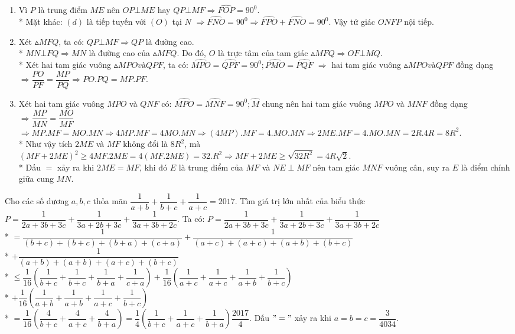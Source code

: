 \begin{ex}
{\begin{enumerate}
       \item Vì $P$ là trung điểm $ME$ nên $OP\bot ME$ hay $QP\bot MF \Rightarrow \widehat{FOP}=90^{0}$.\\*
        Mặt khác: $(d)$ là tiếp tuyến với $(O)$ tại $N$ $\Rightarrow \widehat{FNO}=90^{0}\Rightarrow \widehat{FPO}+ \widehat{FNO}=90^{0}.$ Vậy tứ giác $ONFP$ nội tiếp.
        \item Xét $\vartriangle MFQ$, ta có: $QP\bot MF \Rightarrow QP$ là đường cao.\\*
        $MN\bot FQ \Rightarrow MN$ là đường cao của $\vartriangle MFQ$. Do đó, $O$ là trực tâm của tam giác $\vartriangle MFQ \Rightarrow OF\bot MQ$.\\*
        Xét hai tam giác vuông $\vartriangle MPO và QPF$, ta có: $\widehat{MPO}=\widehat{QPF}=90^{0}; \widehat{PMO}=\widehat{PQF}$ $\Rightarrow$ hai tam giác vuông $\vartriangle MPO và QPF$ đồng dạng $\Rightarrow \dfrac{PO}{PF}=\dfrac{MP}{PQ}\Rightarrow PO.PQ=MP.PF$.
        \item Xét hai tam giác vuông $MPO$ và $QNF$ có: $\widehat{MPO}=\widehat{MNF}=90^{0};\widehat{M}$ chung nên hai tam giác vuông $MPO$ và $MNF$ đồng dạng $\Rightarrow \dfrac{MP}{MN}=\dfrac{MO}{MF}$ $\Rightarrow MP.MF=MO.MN \Rightarrow 4MP.MF=4MO.MN \Rightarrow (4MP).MF=4.MO.MN \Rightarrow 2ME.MF=4.MO.MN=2R.4R=8R^{2}$.\\*
        Như vậy tích $2ME$ và $MF$ không đổi là $8R^{2}$, mà $\left(MF+2ME\right)^{2}\geq 4MF.2ME=4(MF.2ME)=32.R^{2} \Rightarrow MF+2ME\geq \sqrt{32R^{2}}=4R\sqrt{2}$.\\*
        Dấu $=$ xảy ra khi $2ME=MF$, khi đó $E$ là trung điểm của $MF$ và $NE\perp MF$ nên tam giác $MNF$ vuông cân, suy ra $E$ là điểm chính giữa cung $MN$.
        \end{enumerate}
    }
\end{ex}
\begin{ex}%
    Cho các số dương $a, b, c$ thỏa mãn $\dfrac{1}{a+b}+\dfrac{1}{b+c}+\dfrac{1}{a+c}=2017$. Tìm giá trị lớn nhất của biểu thức $P=\dfrac{1}{2a+3b+3c}+\dfrac{1}{3a+2b+3c}+\dfrac{1}{3a+3b+2c}$.
\loigiai
    {
    Ta có: $P=\dfrac{1}{2a+3b+3c}+\dfrac{1}{3a+2b+3c}+\dfrac{1}{3a+3b+2c}$\\*
    $=\dfrac{1}{(b+c)+(b+c)+(b+a)+(c+a)}+\dfrac{1}{(a+c)+(a+c)+(a+b)+(b+c)}$\\*
    $+\dfrac{1}{(a+b)+(a+b)+(a+c)+(b+c)}$\\*
    $\leq\dfrac{1}{16}\left(\dfrac{1}{b+c}+\dfrac{1}{b+c}+\dfrac{1}{b+a}+\dfrac{1}{c+a}\right)+\dfrac{1}{16}\left(\dfrac{1}{a+c}+\dfrac{1}{a+c}+\dfrac{1}{a+b}+\dfrac{1}{b+c}\right)$\\*
    $+\dfrac{1}{16}\left(\dfrac{1}{a+b}+\dfrac{1}{a+b}+\dfrac{1}{a+c}+\dfrac{1}{b+c}\right)$\\*
    $=\dfrac{1}{16}\left(\dfrac{4}{b+c}+\dfrac{4}{a+c}+\dfrac{4}{b+a}\right)=\dfrac{1}{4}\left(\dfrac{1}{b+c}+\dfrac{1}{a+c}+\dfrac{1}{b+a}\right)\dfrac{2017}{4}$.
    Dấu $"="$ xảy ra khi $a=b=c=\dfrac{3}{4034}.$
    }
\end{ex}
